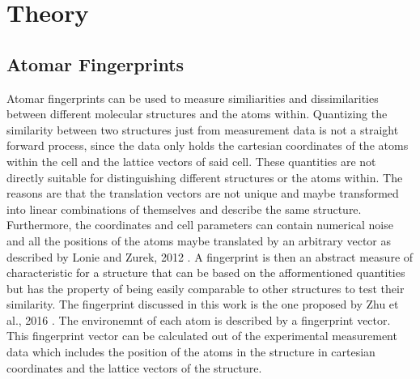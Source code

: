 
\chapter{Theory} %

\label{Chapter1} %


\newcommand{\keyword}[1]{\textbf{#1}}
\newcommand{\tabhead}[1]{\textbf{#1}}
\newcommand{\code}[1]{\texttt{#1}}
\newcommand{\file}[1]{\texttt{\bfseries#1}}
\newcommand{\option}[1]{\texttt{\itshape#1}}


\section{Atomar Fingerprints}
Atomar fingerprints can be used to measure similiarities and dissimilarities between different molecular structures and the atoms within. Quantizing the similarity between two structures just from measurement data is not a straight forward process, since the data only holds the cartesian coordinates of the atoms within the cell and the lattice vectors of said cell. These  quantities are not directly suitable for distinguishing different structures or the atoms within. The reasons are that the translation vectors are not unique and maybe transformed into linear combinations of themselves and describe the same structure. Furthermore, the coordinates and cell parameters can contain numerical noise and all the positions of the atoms maybe translated by an arbitrary vector as described by Lonie and Zurek, 2012 \cite{Lonie2012}. A fingerprint is then an abstract measure of characteristic for a structure that can be based on the afformentioned quantities but has the property of being easily comparable to other structures to test their similarity. The fingerprint discussed in this work is the one proposed by Zhu et al., 2016 \cite{Zhu2016}. The environemnt of each atom is described by a fingerprint vector. This fingerprint vector can be calculated out of the experimental measurement data which includes the position of the atoms in the structure in cartesian coordinates and the lattice vectors of the structure. \\
